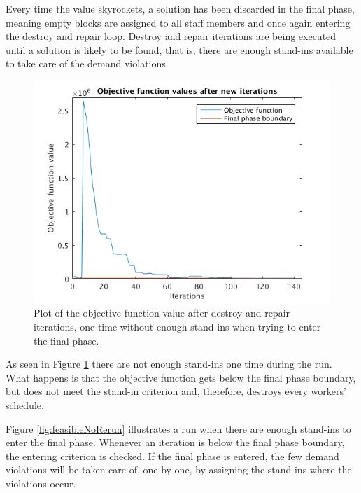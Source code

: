 Every time the value skyrockets, a solution has been discarded in the final phase, meaning empty blocks are assigned to all staff members and once again entering the destroy and repair loop. Destroy and repair iterations are being executed until a solution is likely to be found, that is, there are enough stand-ins available to take care of the demand violations. 

\begin{figure}[!h]
\centering
\includegraphics[scale = 0.8]{Chapters/ImagesClaes/1phase1iter1ReRun.png}
\caption{Plot of the objective function value after destroy and repair iterations, one time without enough stand-ins when trying to enter the final phase.}
\label{fig:feasibleRerun}
\end{figure}

As seen in Figure \ref{fig:feasibleRerun} there are not enough stand-ins one time during the run. What happens is that the objective function gets below the final phase boundary, but does not meet the stand-in criterion and, therefore, destroys every workers' schedule. 

Figure \ref{fig:feasibleNoRerun} illustrates a run when there are enough stand-ins to enter the final phase. Whenever an iteration is below the final phase boundary, the entering criterion is checked. If the final phase is entered, the few demand violations will be taken care of, one by one, by assigning the stand-ins where the violations occur. 

